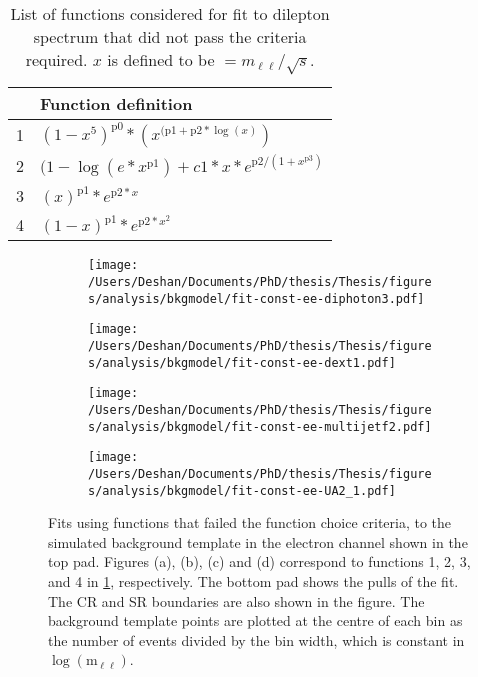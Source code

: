 \begin{table}[h!]
    \centering
    \begin{tabular}{c|l}
         & Function definition \\
        \hline\hline 
        1 & $(1 - x^{5})^{\text{p0}}*(x^{(\text{p1} + \text{p2}*\log(x)})$ \\
        2 & $(1-\log(e*x^{\text{p1}})+c1*x*e^{\text{p2}/(1+x^{\text{p3}})}$ \\
        3 & $(x)^{\text{p1}}*e^{\text{p2}*x}$\\
        4 & $(1-x)^{\text{p1}}*e^{\text{p2}*x^2}$ \\
	\end{tabular}
    \caption[List of functions considered for the background fit]{List of functions considered for fit to dilepton spectrum that did not pass the criteria required. $x$ is defined to be $= m_{\ell\ell}/\sqrt{s}$. }
    \label{tab:bkgmodel:functions}
\end{table}

\begin{figure}[h!]
    \centering
    \begin{subfigure}[b]{0.49\textwidth}
        \centering
        \texttt{[image: /Users/Deshan/Documents/PhD/thesis/Thesis/figures/analysis/bkgmodel/fit-const-ee-diphoton3.pdf]}
        \caption{}
        \label{fig:bkgmodel:fitstoMC3}
    \end{subfigure}
    \begin{subfigure}[b]{0.49\textwidth}
        \centering
        \texttt{[image: /Users/Deshan/Documents/PhD/thesis/Thesis/figures/analysis/bkgmodel/fit-const-ee-dext1.pdf]}
        \caption{}
        \label{fig:bkgmodel:fitstoMC4}
    \end{subfigure}
    \begin{subfigure}[b]{0.49\textwidth}
        \centering
        \texttt{[image: /Users/Deshan/Documents/PhD/thesis/Thesis/figures/analysis/bkgmodel/fit-const-ee-multijetf2.pdf]}
        \caption{}
        \label{fig:bkgmodel:fitstoMC5}
    \end{subfigure}
    \begin{subfigure}[b]{0.49\textwidth}
        \centering
        \texttt{[image: /Users/Deshan/Documents/PhD/thesis/Thesis/figures/analysis/bkgmodel/fit-const-ee-UA2\_1.pdf]}
        \caption{}
        \label{fig:bkgmodel:fitstoMC6}
    \end{subfigure}
    \caption[Fits to the simulated background template in the electron and muon channels using functions that did not pass the selection criteria]{Fits using functions that failed the function choice criteria, to the simulated background template in the electron channel shown in the top pad. Figures (a), (b), (c) and (d) correspond to functions 1, 2, 3, and 4 in \cref{tab:bkgmodel:functions}, respectively. The bottom pad shows the pulls of the fit. The CR and SR boundaries are also shown in the figure. The background template points are plotted at the centre of each bin as the number of events divided by the bin width, which is constant in $\log{(\text{m}_{\ell\ell})}$.}
    \label{fig:bkgmodel:badfitstomc}
\end{figure}
\clearpage

